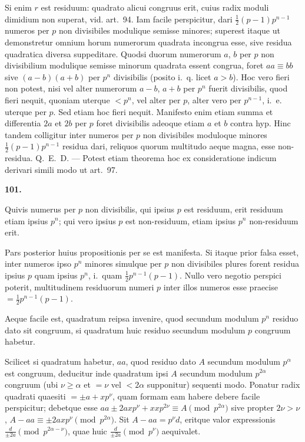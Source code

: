 \documentclass[12pt,a4paper]{article}
\theoremstyle{plain}
\theoremstyle{definition}
\theoremstyle{remark}
\begin{document}
Si enim $r$ est residuum: quadrato alicui congruus erit, cuius radix moduli dimidium non superat, vid. art.~94. Iam facile perspicitur, dari $\frac{1}{2}(p-1)p^{n-1}$ numeros per $p$ non divisibiles modulique semisse minores; superest itaque ut demonstretur omnium horum numerorum quadrata incongrua esse, sive residua quadratica diversa suppeditare. Quodsi duorum numerorum $a$, $b$ per $p$ non divisibilium modulique semisse minorum quadrata essent congrua, foret $aa \equiv bb$ sive $(a-b)(a+b)$ per $p^n$ divisibilis (posito i.~q. licet $a>b$). Hoc vero fieri non potest, nisi vel alter numerorum $a-b$, $a+b$ per $p^n$ fuerit divisibilis, quod fieri nequit, quoniam uterque $<p^n$, vel alter per $p$, alter vero per $p^{n-1}$, i.~e. uterque per $p$. Sed etiam hoc fieri nequit. Manifesto enim etiam summa et differentia $2a$ et $2b$ per $p$ foret divisibilis adeoque etiam $a$ et $b$ contra hyp. Hinc tandem colligitur inter numeros per $p$ non divisibiles moduloque minores $\frac{1}{2}(p-1)p^{n-1}$ residua dari, reliquos quorum multitudo aeque magna, esse non-residua. Q.~E.~D. --- Potest etiam theorema hoc ex consideratione indicum derivari simili modo ut art.~97.

\setcounter{satz}{101}
\addtocounter{satz}{-1}
\textbf{101.}

Quivis numerus per $p$ non divisibilis, qui ipsius $p$ est residuum, erit residuum etiam ipsius $p^n$; qui vero ipsius $p$ est non-residuum, etiam ipsius $p^n$ non-residuum erit.

Pars posterior huius propositionis per se est manifesta. Si itaque prior falsa esset, inter numeros ipso $p^n$ minores simulque per $p$ non divisibiles plures forent residua ipsius $p$ quam ipsius $p^n$, i.~quam $\frac{1}{2}p^{n-1}(p-1)$. Nullo vero negotio perspici poterit, multitudinem residuorum numeri $p$ inter illos numeros esse praecise $=\frac{1}{2}p^{n-1}(p-1)$.

Aeque facile est, quadratum reipsa invenire, quod secundum modulum $p^n$ residuo dato sit congruum, si quadratum huic residuo secundum modulum $p$ congruum habetur.

Scilicet si quadratum habetur, $aa$, quod residuo dato $A$ secundum modulum $p^\alpha$ est congruum, deducitur inde quadratum ipsi $A$ secundum modulum $p^{2\alpha}$ congruum (ubi $\nu \geq \alpha$ et $=\nu$ vel $<2\alpha$ supponitur) sequenti modo. Ponatur radix quadrati quaesiti $= \pm a + xp^\nu$, quam formam eam habere debere facile perspicitur; debetque esse $aa \pm 2axp^\nu + xx p^{2\nu} \equiv A \pmod{p^{2\alpha}}$ sive propter $2\nu > \nu$, $A - aa \equiv \pm 2axp^\nu \pmod{p^{2\alpha}}$. Sit $A - aa = p^\nu d$, eritque valor expressionis $\frac{d}{\pm 2a} \pmod{p^{2\alpha-\nu}}$, quae huic $\frac{d}{\pm 2a} \pmod{p^{\nu}}$ aequivalet.
\end{document}
